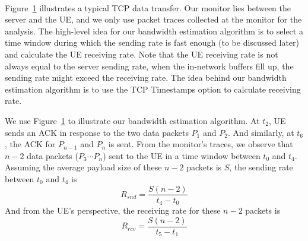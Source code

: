 \label{sec:estimation}

\begin{figure}[t]
\centering
{}\\
\label{fig:algo}
\end{figure}

Figure~\ref{fig:algo} illustrates a typical TCP data transfer. Our monitor lies between the server and the UE, and we only use packet traces collected at the monitor for the analysis. The high-level idea for our bandwidth estimation algorithm is to select a time window during which the sending rate is fast enough (to be discussed later) and calculate the UE receiving rate. Note that the UE receiving rate is not always equal to the server sending rate, \eg when the in-network buffers fill up, the sending rate might exceed the receiving rate. The idea behind our bandwidth estimation algorithm is to use the TCP Timestamps option to calculate receiving rate.

We use Figure~\ref{fig:algo} to illustrate our bandwidth estimation algorithm. At $t_{2}$, UE sends an ACK in response to the two data packets $P_{1}$ and $P_{2}$. And similarly, at $t_{6}$, the ACK for $P_{n-1}$ and $P_{n}$ is sent. From the monitor's traces, we observe that $n-2$ data packets ($P_{3} \cdots P_{n}$) sent to the UE in a time window between $t_{0}$ and $t_{4}$. Assuming the average payload size of these $n-2$ packets is $S$, the sending rate between $t_{0}$ and $t_{4}$ is
\begin{equation}
\label{eq:snd}
R_{snd} = \frac{S (n - 2)}{t_{4} - t_{0}}
\end{equation}
And from the UE's perspective, the receiving rate for these $n-2$ packets is
\begin{displaymath}
R_{rcv} = \frac{S (n - 2)}{t_{5} - t_{1}}
\end{displaymath}

